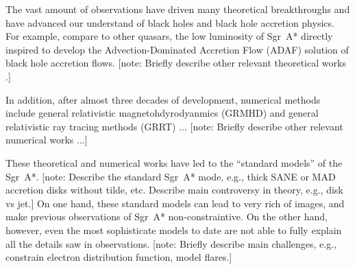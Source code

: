 \documentclass[twocolumn,tighten,dvipsnames]{aastex63}
\newcommand\sgra{Sgr~A*\xspace}
\newcommand\<{{\langle}}
\renewcommand\>{{\rangle}} %
\newcommand\note[1]{{\color{OliveGreen}[note: #1]}}
\begin{document}
The vast amount of observations have driven many theoretical
breakthroughs and have advanced our understand of black holes and
black hole accretion physics.
For example, compare to other quasars, the low luminosity of \sgra
directly inspired \citet{1994ApJ...428L..13N, 1995ApJ...444..231N,
  1995ApJ...452..710N, 1996A&AS..120C.287N, 1998ApJ...492..554N} to
develop the Advection-Dominated Accretion Flow (ADAF) solution of
black hole accretion flows.
\note{Briefly describe other relevant theoretical works
  \citep{1999ApJ...522..870M, 2000ApJ...541..234O,
    2003ANS...324..445M, 2006MNRAS.370..219M, 2007MNRAS.379.1519M,
    2009A&A...508L..13M, 2009ApJ...698..676D, 2009ApJ...701..521C,
    2009ApJ...706..497M, 2012MNRAS.421.1315Z, 2013A&A...559L...3M,
    2014A&A...570A...7M, 2014ApJ...790....1B, 2015A&A...576A..41B,
    2015ApJ...799....1C, 2015ApJ...802...69B, 2015ApJ...812..103C,
    2015ApJ...814..115P, 2015Sci...350.1242J, 2016A&A...588A..57F,
    2016ApJ...817..173L, 2016ApJ...818..121P, 2016ApJ...824...40O,
    2016ApJ...826...77B, 2016ApJ...831....4P, 2016MNRAS.455.2187M,
    2016PhRvL.116c1101J, 2017ApJ...837..180G, 2017ApJ...844...35M,
    2017ApJ...851..148M, 2017MNRAS.467.3604R, 2018A&A...612A..34D,
    2018ApJ...856..163M, 2018ApJ...859...60L, 2018ApJ...863..148P,
    2018ApJ...865..104J, 2018ApJ...868..101B, 2018JCAP...07..015H,
    2018MNRAS.478.1875J, 2018MNRAS.478.5209C, 2019ApJ...871...30I,
    2019ApJ...881L...2B, 2019ApJ...884..148B, 2019ApJ...886...96H,
    2019GReGr..51..137P, 2020ApJ...896L...6R, 2020ApJ...897...99T,
    2020MNRAS.492.3272R, 2020MNRAS.493.1404A, 2020MNRAS.494.4168D,
    2020MNRAS.494.5923P, 2020arXiv200514251B, 2020arXiv200603657D, 2020arXiv200603658P}.}

In addition, after almost three decades of development, numerical
methods include general relativistic magnetohdyrodyanmics (GRMHD) and
general relativistic ray tracing methods (GRRT) ...
\note{Briefly describe other relevant numerical works \citep{
    1984ApJ...277..296H, 1984ApJS...55..211H, 2001ApJ...548..348H,
    2003ApJ...589..458D, 2003ApJ...589..444G, 2006ApJ...641..103H,
    2006ApJ...651.1031S, 2019ApJS..243...26P} ...}

These theoretical and numerical works have led to the ``standard
models'' of the \sgra.
\note{Describe the standard \sgra mode, e.g., thick SANE or MAD
  accretion disks without tilde, etc.
  Describe main controversy in theory, e.g., disk vs jet.}
On one hand, these standard models can lead to very rich of images,
and make previous observations of \sgra non-constraintive.
On the other hand, however, even the most sophisticate models to date
are not able to fully explain all the details saw in observations.
\note{Briefly describe main challenges, e.g., constrain electron
  distribution function, model flares.}
\end{document}
